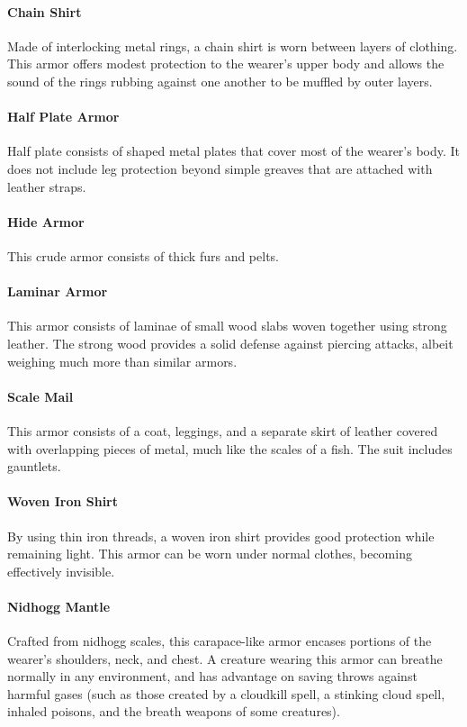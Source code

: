     \paragraph{Chain Shirt}
        Made of interlocking metal rings, a chain shirt is worn between layers of clothing.
        This armor offers modest protection to the wearer's upper body and allows the sound of the rings rubbing against one another to be muffled by outer layers.
    \paragraph{Half Plate Armor}
        Half plate consists of shaped metal plates that cover most of the wearer's body.
        It does not include leg protection beyond simple greaves that are attached with leather straps.
    \paragraph{Hide Armor}
        This crude armor consists of thick furs and pelts.
    \paragraph{Laminar Armor}
        This armor consists of laminae of small wood slabs woven together using strong leather.
        The strong wood provides a solid defense against piercing attacks, albeit weighing much more than similar armors.
    \paragraph{Scale Mail}
        This armor consists of a coat, leggings, and a separate skirt of leather covered with overlapping pieces of metal, much like the scales of a fish.
        The suit includes gauntlets.
    \paragraph{Woven Iron Shirt}
        By using thin iron threads, a woven iron shirt provides good protection while remaining light.
        This armor can be worn under normal clothes, becoming effectively invisible.
    \paragraph{Nidhogg Mantle}
        Crafted from nidhogg scales, this carapace-like armor encases portions of the wearer's shoulders, neck, and chest.
        A creature wearing this armor can breathe normally in any environment, and has advantage on saving throws against harmful gases (such as those created by a cloudkill spell, a stinking cloud spell, inhaled poisons, and the breath weapons of some creatures).
